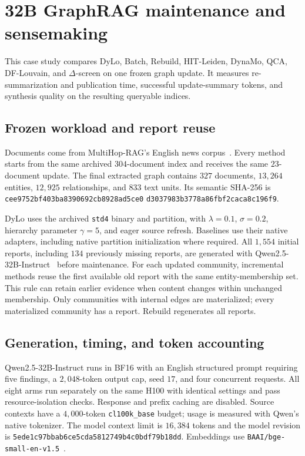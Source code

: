 \section{32B GraphRAG maintenance and sensemaking}\label{app:exp5-detail}

This case study compares DyLo, Batch, Rebuild, HIT-Leiden, DynaMo, QCA,
DF-Louvain, and $\Delta$-screen on one frozen graph update. It measures
re-summarization and publication time, successful update-summary tokens,
and synthesis quality on the resulting queryable indices.

\subsection{Frozen workload and report reuse}\label{app:case-workload}

Documents come from MultiHop-RAG's English news corpus~\cite{tang2024multihoprag}.
Every method starts from the same archived $304$-document index and receives
the same $23$-document update. The final extracted graph contains $327$
documents, $13{,}264$ entities, $12{,}925$ relationships, and $833$ text units.
Its semantic SHA-256 is
\texttt{cee9752bf403ba839}\allowbreak\texttt{0692cb8928ad5ce0}\allowbreak
\texttt{d3037983b3778a86}\allowbreak\texttt{fbf2caca8c196f9}.

DyLo uses the archived \texttt{std4} binary and partition, with
$\lambda=0.1$, $\sigma=0.2$, hierarchy parameter $\gamma=5$, and eager
source refresh. Baselines use their native adapters, including native
partition initialization where required. All $1{,}554$ initial reports,
including $134$ previously missing reports, are generated with
Qwen2.5-32B-Instruct~\cite{yang2024qwen25} before maintenance.
For each updated community, incremental methods reuse the first available
old report with the same entity-membership set. This rule can retain
earlier evidence when content changes within unchanged membership.
Only communities with internal edges are materialized; every materialized
community has a report. Rebuild regenerates all reports.

\subsection{Generation, timing, and token accounting}\label{app:case-accounting}

Qwen2.5-32B-Instruct runs in BF16 with an English structured prompt requiring
five findings, a $2{,}048$-token output cap, seed $17$, and four concurrent
requests. All eight arms run separately on the same H100 with identical
settings and pass resource-isolation checks. Response and prefix caching
are disabled. Source contexts have a $4{,}000$-token \texttt{cl100k\_base}
budget; usage is measured with Qwen's native tokenizer. The model context
limit is $16{,}384$ tokens and the model revision is
\texttt{5ede1c97bbab6ce5}\allowbreak\texttt{cda5812749b4c0bdf79b18dd}.
Embeddings use \texttt{BAAI/bge-small-en-v1.5}~\cite{xiao2024cpack}.

